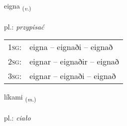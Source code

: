 \documentclass[frontgrid, backgrid]{flacards}\usepackage[]{graphicx}\usepackage[]{xcolor}
\begin{document}
\renewcommand{\flhead}{\vskip5pt \fboxsep=0pt {\small\bfseries\footnotesize Sagnorð | czasownik}}
\renewcommand{\fcfoot}{\vskip5pt \fboxsep=0pt \hspace{2pt}{\small\bfseries\footnotesize 1K}}

\renewcommand{\blhead}{\vskip5pt {\small\bfseries\footnotesize Sagnorð | czasownik }}
\renewcommand{\bcfoot}{\vskip5pt \hspace{2pt}{\small\bfseries\footnotesize 1K}}


{eigna \small{\textsubscript{(\textit{v.})}} \\[1ex] %
\textphonetic{[eikna]} \\
pl.: \emph{przypisać} \\  [2ex]
\renewcommand*{\arraystretch}{0.8}
\begin{tabular}{p{1cm}l}
\textsc{1sg}: & eigna -- eignaði -- eignað \\ 
\textsc{2sg}: & eignar -- eignaðir -- eignað \\ 
\textsc{3sg}: & eignar -- eignaði -- eignað \\ 
\end{tabular}
}

\renewcommand{\flhead}{\vskip5pt \fboxsep=0pt {\small\bfseries\footnotesize Nafnorð | rzeczownik}}
\renewcommand{\fcfoot}{\vskip5pt \fboxsep=0pt \hspace{2pt}{\small\bfseries\footnotesize 1K}}

\renewcommand{\blhead}{\vskip5pt {\small\bfseries\footnotesize Nafnorð | rzeczownik }}
\renewcommand{\bcfoot}{\vskip5pt \hspace{2pt}{\small\bfseries\footnotesize 1K}}


{líkami \small{\textsubscript{(\textit{m.})}} \\[1ex] %
\textphonetic{[liːkamɪ]} \\
pl.: \emph{ciało} \\  [2ex]
\renewcommand*{\arraystretch}{0.8}
}
\end{document}

